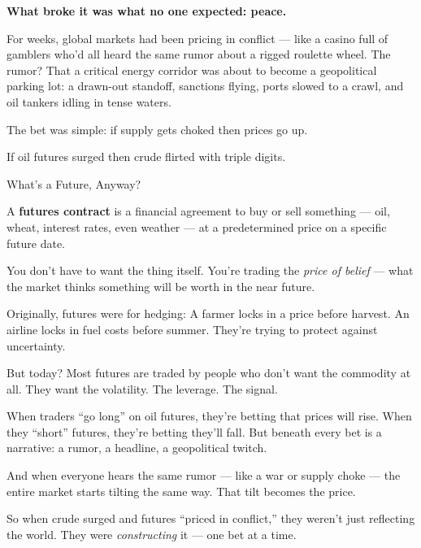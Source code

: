 \textbf{What broke it was what no one expected: peace.}

For weeks, global markets had been pricing in conflict — like a casino full of gamblers who'd all heard the same rumor 
about a rigged roulette wheel. The rumor? That a critical energy corridor was about to become a geopolitical parking 
lot: a drawn-out standoff, sanctions flying, ports slowed to a crawl, and oil tankers idling in tense waters. 

The bet was simple: if supply gets choked then prices go up.

If oil futures surged then crude flirted with triple digits.

\medskip

\begin{TechnicalSidebar}{What’s a Future, Anyway?}

  A \textbf{futures contract} is a financial agreement to buy or sell something — oil, wheat, interest rates, even 
  weather — at a predetermined price on a specific future date.

  \medskip
  
  You don’t have to want the thing itself.  
  You’re trading the \textit{price of belief} — what the market thinks something will be worth in the near future.
  
  \medskip
  
  Originally, futures were for hedging:  
  A farmer locks in a price before harvest. An airline locks in fuel costs before summer.  
  They’re trying to protect against uncertainty.

  \medskip
  
  But today?  
  Most futures are traded by people who don’t want the commodity at all.  
  They want the volatility. The leverage. The signal.
  
  \medskip
  
  When traders “go long” on oil futures, they’re betting that prices will rise.  
  When they “short” futures, they’re betting they’ll fall.  
  But beneath every bet is a narrative: a rumor, a headline, a geopolitical twitch.

  \medskip
  
  And when everyone hears the same rumor — like a war or supply choke — the entire market starts tilting the same way.  
  That tilt becomes the price.
  
  \medskip
  
  So when crude surged and futures “priced in conflict,” they weren’t just reflecting the world.  
  They were \textit{constructing} it — one bet at a time.
  
\end{TechnicalSidebar}

